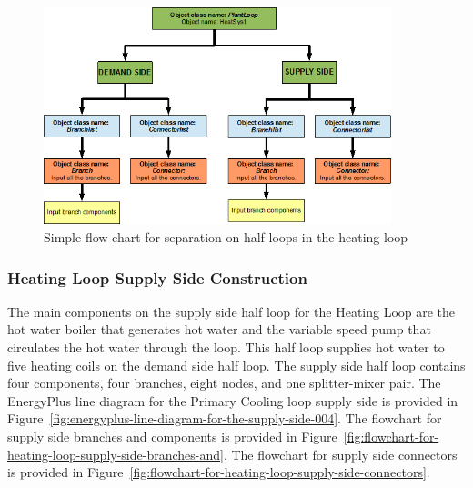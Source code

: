 \begin{figure}[hbtp] %
\centering
\includegraphics[width=0.9\textwidth, height=0.9\textheight, keepaspectratio=true]{media/image076.png}
\caption{Simple flow chart for separation on half loops in the heating loop \protect \label{fig:simple-flow-chart-for-separation-on-half-002}}
\end{figure}

\subsubsection{Heating Loop Supply Side Construction}\label{heating-loop-supply-side-construction}

The main components on the supply side half loop for the Heating Loop are the hot water boiler that generates hot water and the variable speed pump that circulates the hot water through the loop. This half loop supplies hot water to five heating coils on the demand side half loop. The supply side half loop contains four components, four branches, eight nodes, and one splitter-mixer pair. The EnergyPlus line diagram for the Primary Cooling loop supply side is provided in Figure~\ref{fig:energyplus-line-diagram-for-the-supply-side-004}. The flowchart for supply side branches and components is provided in Figure~\ref{fig:flowchart-for-heating-loop-supply-side-branches-and}. The flowchart for supply side connectors is provided in Figure~\ref{fig:flowchart-for-heating-loop-supply-side-connectors}.

